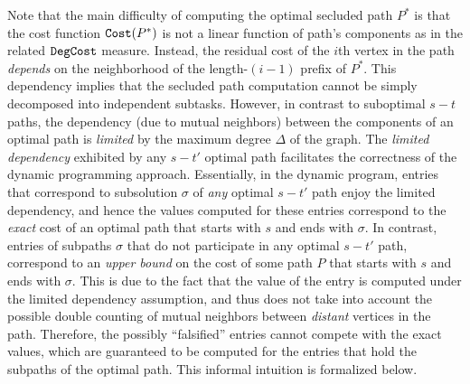 \documentclass[12pt]{article}
\def\Cost{\mbox{\tt Cost}}
\newcommand{\MAXDEG}[0]{\Delta}
\def\Cost{\mbox{\tt Cost}}
\def\DegCost{\mbox{\tt DegCost}}
\begin{document}
Note that the main difficulty of computing the optimal secluded path $P^{*}$ is that the cost function $\Cost(P^{*})$ is not a linear function of path's  components as in the related $\DegCost$ measure. Instead, the residual cost of the $i$th vertex in the path \emph{depends} on the neighborhood of the length-$(i-1)$ prefix of $P^{*}$. This dependency implies that the secluded path computation cannot be simply decomposed into independent subtasks.
However, in contrast to suboptimal $s-t$ paths, the dependency (due to mutual neighbors) between the components of an optimal path is \emph{limited} by the maximum degree $\MAXDEG$ of the graph. The \emph{limited dependency} exhibited by any $s-t'$ optimal path facilitates the correctness of the dynamic programming approach. Essentially, in the dynamic program, entries that correspond to subsolution $\sigma$ of \emph{any} optimal $s-t'$ path enjoy the limited dependency, and hence the values computed for these entries correspond to the \emph{exact} cost of an optimal path that starts with $s$ and ends with $\sigma$. In contrast, entries of subpaths $\sigma$ that do not participate in any optimal $s-t'$ path, correspond to an \emph{upper bound} on the cost of some path $P$ that starts with $s$ and ends with $\sigma$. This is due to the fact that the value of the entry is computed under the limited dependency assumption, and thus does not take into account the possible double counting of mutual neighbors between \emph{distant} vertices in the path. Therefore, the possibly ``falsified'' entries cannot compete with the exact values, which are guaranteed to be computed for the entries that hold the subpaths of the optimal path. This informal intuition is formalized below.
\end{document}
